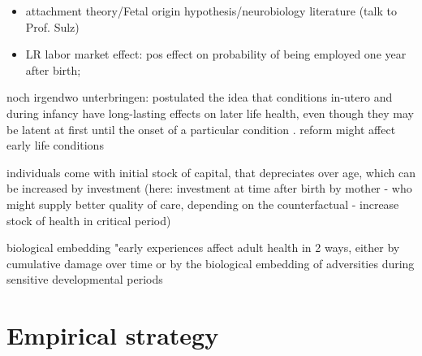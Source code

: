 \documentclass[11pt, a4paper]{article} %
\begin{document}










\begin{itemize}
	\item attachment theory/Fetal origin hypothesis/neurobiology literature (talk to Prof. Sulz)

	\item LR labor market effect: pos effect on probability of being employed one year after birth; \cite{albagli2018}
\end{itemize} 
noch irgendwo unterbringen: 
\cite{Barker1990origins} postulated the idea that conditions in-utero and during infancy have long-lasting effects on later life health, even though they may be latent at first until the onset of a particular condition \citep{almond2011fetalorigins}. reform might affect early life conditions 

\cite{grossman1972healthcapital} individuals come with initial stock of capital, that depreciates over age, which can be increased by investment (here: investment at time after birth by mother - who might supply better quality of care, depending on the counterfactual - increase stock of health in critical period)

\cite{shonkoff2009neuroscience} biological embedding
"early experiences affect adult health in 2 ways, either by cumulative damage over time or by the biological embedding of adversities during sensitive developmental periods


\newpage
\section{Empirical strategy}\label{sec:empirical_strategy}
\end{document}
